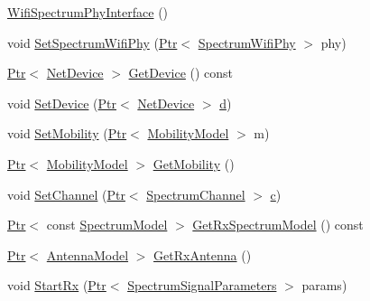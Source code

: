 \begin{DoxyCompactItemize}
\item 
\hyperlink{classns3_1_1WifiSpectrumPhyInterface_a37aef796e7395c594d4784f76ad614ba}{Wifi\+Spectrum\+Phy\+Interface} ()
\item 
void \hyperlink{classns3_1_1WifiSpectrumPhyInterface_a4ab3c491c9b654d578ffcb661c09e9e6}{Set\+Spectrum\+Wifi\+Phy} (\hyperlink{classns3_1_1Ptr}{Ptr}$<$ \hyperlink{classns3_1_1SpectrumWifiPhy}{Spectrum\+Wifi\+Phy} $>$ phy)
\item 
\hyperlink{classns3_1_1Ptr}{Ptr}$<$ \hyperlink{classns3_1_1NetDevice}{Net\+Device} $>$ \hyperlink{classns3_1_1WifiSpectrumPhyInterface_ad12c8f237e32fafb544f8f06852c0ab9}{Get\+Device} () const 
\item 
void \hyperlink{classns3_1_1WifiSpectrumPhyInterface_a114fe9af53091489cfabb57210096419}{Set\+Device} (\hyperlink{classns3_1_1Ptr}{Ptr}$<$ \hyperlink{classns3_1_1NetDevice}{Net\+Device} $>$ \hyperlink{lte__pathloss_8m_a1aabac6d068eef6a7bad3fdf50a05cc8}{d})
\item 
void \hyperlink{classns3_1_1WifiSpectrumPhyInterface_adb53bc9aff284a28fc1e8139c7098133}{Set\+Mobility} (\hyperlink{classns3_1_1Ptr}{Ptr}$<$ \hyperlink{classns3_1_1MobilityModel}{Mobility\+Model} $>$ m)
\item 
\hyperlink{classns3_1_1Ptr}{Ptr}$<$ \hyperlink{classns3_1_1MobilityModel}{Mobility\+Model} $>$ \hyperlink{classns3_1_1WifiSpectrumPhyInterface_a95d2c7c3473c5cc39e7bbe3232d870ae}{Get\+Mobility} ()
\item 
void \hyperlink{classns3_1_1WifiSpectrumPhyInterface_a818000c0f63f7adc5b4b223a78c8ab58}{Set\+Channel} (\hyperlink{classns3_1_1Ptr}{Ptr}$<$ \hyperlink{classns3_1_1SpectrumChannel}{Spectrum\+Channel} $>$ \hyperlink{mmwave_2model_2fading-traces_2fading__trace__generator_8m_ae0323a9039add2978bf5b49550572c7c}{c})
\item 
\hyperlink{classns3_1_1Ptr}{Ptr}$<$ const \hyperlink{classns3_1_1SpectrumModel}{Spectrum\+Model} $>$ \hyperlink{classns3_1_1WifiSpectrumPhyInterface_a45bee0a3d7ecd901b17bb5c0fd6abe34}{Get\+Rx\+Spectrum\+Model} () const 
\item 
\hyperlink{classns3_1_1Ptr}{Ptr}$<$ \hyperlink{classns3_1_1AntennaModel}{Antenna\+Model} $>$ \hyperlink{classns3_1_1WifiSpectrumPhyInterface_a3220c5ea30680fd23d1d95dac2ece377}{Get\+Rx\+Antenna} ()
\item 
void \hyperlink{classns3_1_1WifiSpectrumPhyInterface_a30e2efbacd400ef27f4a0bfb501bf940}{Start\+Rx} (\hyperlink{classns3_1_1Ptr}{Ptr}$<$ \hyperlink{structns3_1_1SpectrumSignalParameters}{Spectrum\+Signal\+Parameters} $>$ params)
\end{DoxyCompactItemize}
